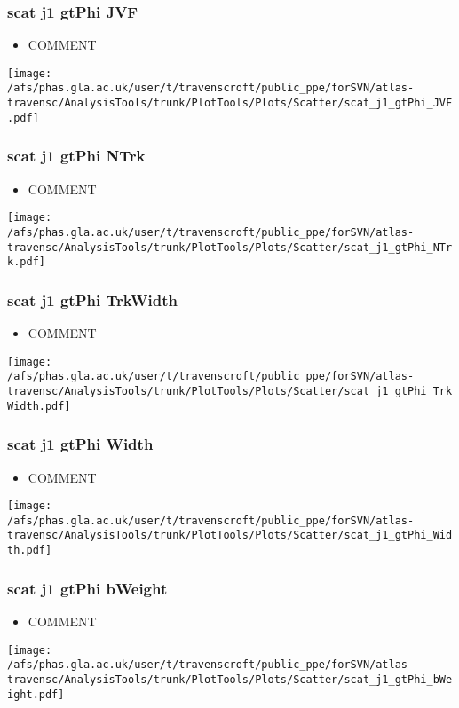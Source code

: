\documentclass{beamer}
\begin{document}
\begin{frame}
\frametitle{scat j1 gtPhi JVF}
\begin{itemize}
\item COMMENT
\end{itemize}
\begin{center}
\texttt{[image: /afs/phas.gla.ac.uk/user/t/travenscroft/public\_ppe/forSVN/atlas-travensc/AnalysisTools/trunk/PlotTools/Plots/Scatter/scat\_j1\_gtPhi\_JVF.pdf]}
\end{center}
\end{frame}

\begin{frame}
\frametitle{scat j1 gtPhi NTrk}
\begin{itemize}
\item COMMENT
\end{itemize}
\begin{center}
\texttt{[image: /afs/phas.gla.ac.uk/user/t/travenscroft/public\_ppe/forSVN/atlas-travensc/AnalysisTools/trunk/PlotTools/Plots/Scatter/scat\_j1\_gtPhi\_NTrk.pdf]}
\end{center}
\end{frame}

\begin{frame}
\frametitle{scat j1 gtPhi TrkWidth}
\begin{itemize}
\item COMMENT
\end{itemize}
\begin{center}
\texttt{[image: /afs/phas.gla.ac.uk/user/t/travenscroft/public\_ppe/forSVN/atlas-travensc/AnalysisTools/trunk/PlotTools/Plots/Scatter/scat\_j1\_gtPhi\_TrkWidth.pdf]}
\end{center}
\end{frame}

\begin{frame}
\frametitle{scat j1 gtPhi Width}
\begin{itemize}
\item COMMENT
\end{itemize}
\begin{center}
\texttt{[image: /afs/phas.gla.ac.uk/user/t/travenscroft/public\_ppe/forSVN/atlas-travensc/AnalysisTools/trunk/PlotTools/Plots/Scatter/scat\_j1\_gtPhi\_Width.pdf]}
\end{center}
\end{frame}

\begin{frame}
\frametitle{scat j1 gtPhi bWeight}
\begin{itemize}
\item COMMENT
\end{itemize}
\begin{center}
\texttt{[image: /afs/phas.gla.ac.uk/user/t/travenscroft/public\_ppe/forSVN/atlas-travensc/AnalysisTools/trunk/PlotTools/Plots/Scatter/scat\_j1\_gtPhi\_bWeight.pdf]}
\end{center}
\end{frame}
\end{document}
